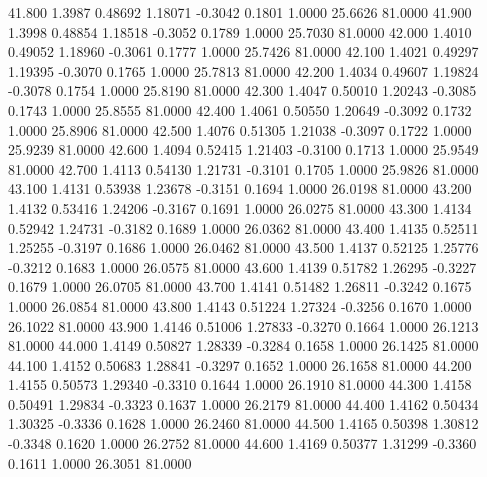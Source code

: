   41.800   1.3987   0.48692   1.18071  -0.3042   0.1801   1.0000  25.6626  81.0000
  41.900   1.3998   0.48854   1.18518  -0.3052   0.1789   1.0000  25.7030  81.0000
  42.000   1.4010   0.49052   1.18960  -0.3061   0.1777   1.0000  25.7426  81.0000
  42.100   1.4021   0.49297   1.19395  -0.3070   0.1765   1.0000  25.7813  81.0000
  42.200   1.4034   0.49607   1.19824  -0.3078   0.1754   1.0000  25.8190  81.0000
  42.300   1.4047   0.50010   1.20243  -0.3085   0.1743   1.0000  25.8555  81.0000
  42.400   1.4061   0.50550   1.20649  -0.3092   0.1732   1.0000  25.8906  81.0000
  42.500   1.4076   0.51305   1.21038  -0.3097   0.1722   1.0000  25.9239  81.0000
  42.600   1.4094   0.52415   1.21403  -0.3100   0.1713   1.0000  25.9549  81.0000
  42.700   1.4113   0.54130   1.21731  -0.3101   0.1705   1.0000  25.9826  81.0000
  43.100   1.4131   0.53938   1.23678  -0.3151   0.1694   1.0000  26.0198  81.0000
  43.200   1.4132   0.53416   1.24206  -0.3167   0.1691   1.0000  26.0275  81.0000
  43.300   1.4134   0.52942   1.24731  -0.3182   0.1689   1.0000  26.0362  81.0000
  43.400   1.4135   0.52511   1.25255  -0.3197   0.1686   1.0000  26.0462  81.0000
  43.500   1.4137   0.52125   1.25776  -0.3212   0.1683   1.0000  26.0575  81.0000
  43.600   1.4139   0.51782   1.26295  -0.3227   0.1679   1.0000  26.0705  81.0000
  43.700   1.4141   0.51482   1.26811  -0.3242   0.1675   1.0000  26.0854  81.0000
  43.800   1.4143   0.51224   1.27324  -0.3256   0.1670   1.0000  26.1022  81.0000
  43.900   1.4146   0.51006   1.27833  -0.3270   0.1664   1.0000  26.1213  81.0000
  44.000   1.4149   0.50827   1.28339  -0.3284   0.1658   1.0000  26.1425  81.0000
  44.100   1.4152   0.50683   1.28841  -0.3297   0.1652   1.0000  26.1658  81.0000
  44.200   1.4155   0.50573   1.29340  -0.3310   0.1644   1.0000  26.1910  81.0000
  44.300   1.4158   0.50491   1.29834  -0.3323   0.1637   1.0000  26.2179  81.0000
  44.400   1.4162   0.50434   1.30325  -0.3336   0.1628   1.0000  26.2460  81.0000
  44.500   1.4165   0.50398   1.30812  -0.3348   0.1620   1.0000  26.2752  81.0000
  44.600   1.4169   0.50377   1.31299  -0.3360   0.1611   1.0000  26.3051  81.0000
